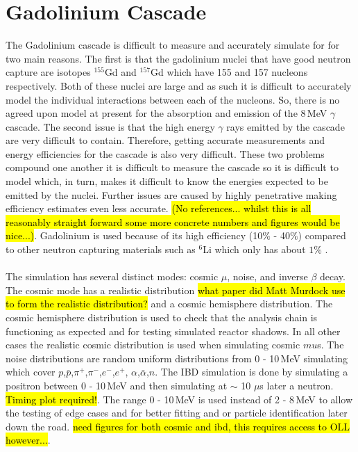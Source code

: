 \section{Gadolinium Cascade}\label{sec:geant4Simulation_gdCascade}
The Gadolinium cascade is difficult to measure and accurately simulate for for two main reasons. The first is that the gadolinium nuclei that have good neutron capture are isotopes $^{155}$Gd and $^{157}$Gd which have 155 and 157 nucleons respectively. Both of these nuclei are large and as such it is difficult to accurately model the individual interactions between each of the nucleons. So, there is no agreed upon model at present for the absorption and emission of the 8\,MeV $\gamma$ cascade. The second issue is that the high energy $\gamma$ rays emitted by the cascade are very difficult to contain. Therefore, getting accurate measurements and energy efficiencies for the cascade is also very difficult. These two problems compound one another it is difficult to measure the cascade so it is difficult to model which, in turn, makes it difficult to know the energies expected to be emitted by the nuclei. Further issues are caused by highly penetrative making efficiency estimates even less accurate. \hl{(No references... whilst this is all reasonably straight forward some more concrete numbers and figures would be nice...)}. Gadolinium is used because of its high efficiency (10$\%$ - 40$\%$) compared to other neutron capturing materials such as $^6$Li which only has about $1\%$ \cite{Abdushukurov_2010}. 
\\\\The simulation has several distinct modes: cosmic $\mu$, noise, and inverse $\beta$ decay. The cosmic mode has a realistic distribution \hl{what paper did Matt Murdock use to form the realistic distribution?} and a cosmic hemisphere distribution. The cosmic hemisphere distribution is used to check that the analysis chain is functioning as expected and for testing simulated reactor shadows. In all other cases the realistic cosmic distribution is used when simulating cosmic $mu$s. The noise distributions are random uniform distributions from 0 - 10\,MeV simulating which cover $p$,$\bar{p}$,$\pi^+$,$\pi^-$,$e^-$,$e^+$, $\alpha$,$\bar{\alpha}$,$n$. The IBD simulation is done by simulating a positron between 0 - 10\,MeV and then simulating at $\sim$ 10 $\mu$s later a neutron. \hl{Timing plot required!}. The range 0 - 10\,MeV is used instead of 2 - 8\,MeV to allow the testing of edge cases and for better fitting and or particle identification later down the road. \hl{need figures for both cosmic and ibd, this requires access to OLL however...}.
